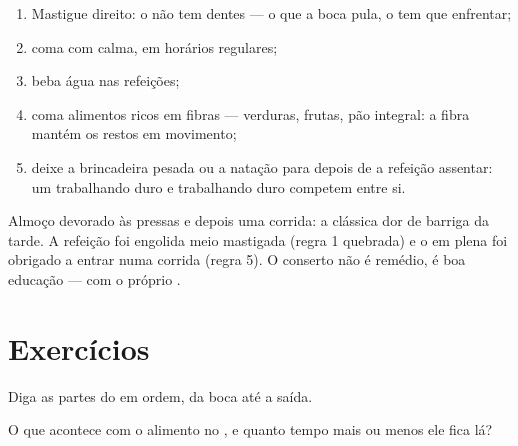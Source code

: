 \begin{method}\label{met:g4:journey-of-food:habits}
\begin{enumerate}
  \item Mastigue direito: o  não tem dentes --- o que a boca
        pula, o  tem que enfrentar;
  \item coma com calma, em horários regulares;
  \item beba água nas refeições;
  \item coma alimentos ricos em fibras --- verduras, frutas, pão
        integral: a fibra mantém os restos em movimento;
  \item deixe a brincadeira pesada ou a natação para depois de a
        refeição assentar: um  trabalhando duro e 
        trabalhando duro competem entre si.
\end{enumerate}
\end{method}

\begin{example}\label{ex:g4:journey-of-food:ache}
Almoço devorado às pressas e depois uma corrida: a clássica dor de
barriga da tarde. A refeição foi engolida meio mastigada (regra 1
quebrada) e o  em plena  foi obrigado a entrar numa
corrida (regra 5). O conserto não é remédio, é boa educação --- com o
próprio .
\end{example}

\section{Exercícios}

\begin{exercise}[$\star$]\label{exo:g4:journey-of-food:1}
Diga as partes do  em ordem, da boca até a saída.
\end{exercise}

\begin{exercise}[$\star$]\label{exo:g4:journey-of-food:2}
O que acontece com o alimento no , e quanto tempo mais ou
menos ele fica lá?
\end{exercise}


